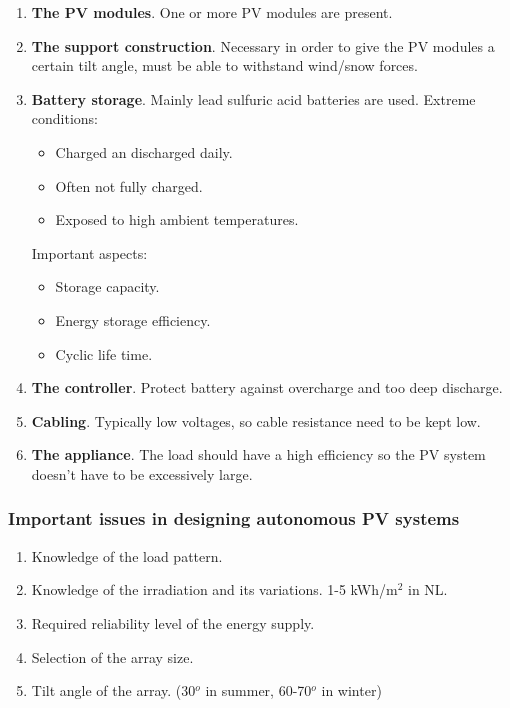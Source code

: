 \documentclass[a4paper,10pt]{article}
\begin{document}
\begin{enumerate}[label=\alph*.]
 \item \textbf{The PV modules}. One or more PV modules are present.
 \item \textbf{The support construction}. Necessary in order to give the PV modules a certain tilt angle, must be able to withstand wind/snow forces.
 \item \textbf{Battery storage}. Mainly lead sulfuric acid batteries are used. Extreme conditions:
 \begin{itemize}
  \item Charged an discharged daily.
  \item Often not fully charged.
  \item Exposed to high ambient temperatures.
 \end{itemize}
 Important aspects:
 \begin{itemize}
  \item Storage capacity.
  \item Energy storage efficiency.
  \item Cyclic life time.
 \end{itemize}
 \item \textbf{The controller}. Protect battery against overcharge and too deep discharge.
 \item \textbf{Cabling}. Typically low voltages, so cable resistance need to be kept low.
 \item \textbf{The appliance}. The load should have a high efficiency so the PV system doesn't have to be excessively large.
\end{enumerate}

\subsubsection{Important issues in designing autonomous PV systems}
\begin{enumerate}
 \item Knowledge of the load pattern.
 \item Knowledge of the irradiation and its variations. 1-5 kWh/m$^2$ in NL.
 \item Required reliability level of the energy supply.
 \item Selection of the array size.
 \item Tilt angle of the array. (30$^o$ in summer, 60-70$^o$ in winter)
\end{enumerate}
\end{document}

